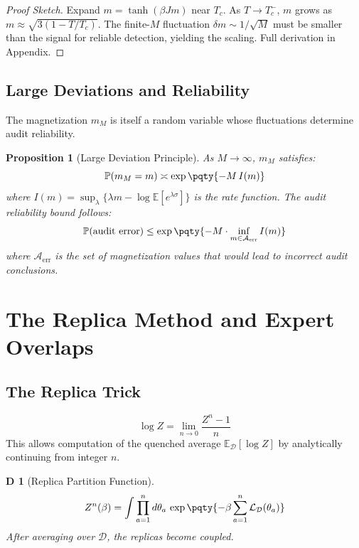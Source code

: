 \documentclass[12pt,a4paper]{article}
\newtheorem{proposition}[theorem]{Proposition}
\newtheorem{definition}[theorem]Definition
\newcommand{\E}{\mathbb{E}}
\newcommand{\Pbb}{\mathbb{P}}
\newcommand{\D}{\mathcal{D}}
\newcommand{\loss}{\mathcal{L}}
\begin{document}
\begin{proof}[Proof Sketch]
Expand \(m = \tanh(\beta J m)\) near \(T_c\). As \(T \to T_c^-\), \(m\) grows as \(m \approx \sqrt{3(1 - T/T_c)}\). The finite-\(M\) fluctuation \(\delta m \sim 1/\sqrt{M}\) must be smaller than the signal for reliable detection, yielding the scaling. Full derivation in Appendix.
\end{proof}

\subsection{Large Deviations and Reliability}
The magnetization \(m_M\) is itself a random variable whose fluctuations determine audit reliability.

\begin{proposition}[Large Deviation Principle]\label{prop:large_dev}
As \(M \to \infty\), \(m_M\) satisfies:
\begin{equation}\label{eq:ldp}
\Pbb(m_M = m) \asymp \exp\pqty{-M \, I(m)}
\end{equation}
where \(I(m) = \sup_{\lambda} \{ \lambda m - \log \E[e^{\lambda \sigma}] \}\) is the rate function. The audit reliability bound follows:
\begin{equation}\label{eq:reliability}
\Pbb(\text{audit error}) \leq \exp\pqty{-M \cdot \inf_{m \in \mathcal{A}_{\text{err}}} I(m)}
\end{equation}
where \(\mathcal{A}_{\text{err}}\) is the set of magnetization values that would lead to incorrect audit conclusions.
\end{proposition}
\section{The Replica Method and Expert Overlaps}
\subsection{The Replica Trick}
\begin{equation}\label{eq:replica_trick}
\log Z = \lim_{n \to 0} \frac{Z^n - 1}{n}
\end{equation}
This allows computation of the quenched average \(\E_\D[\log Z]\) by analytically continuing from integer \(n\).

\begin{definition}[Replica Partition Function]
\begin{equation}\label{eq:replica_partition}
Z^n(\beta) = \int \prod_{a=1}^{n} d\theta_a \, \exp\pqty{-\beta \sum_{a=1}^{n} \loss_\D(\theta_a)}
\end{equation}
After averaging over \(\D\), the replicas become coupled.
\end{definition}
\end{document}

